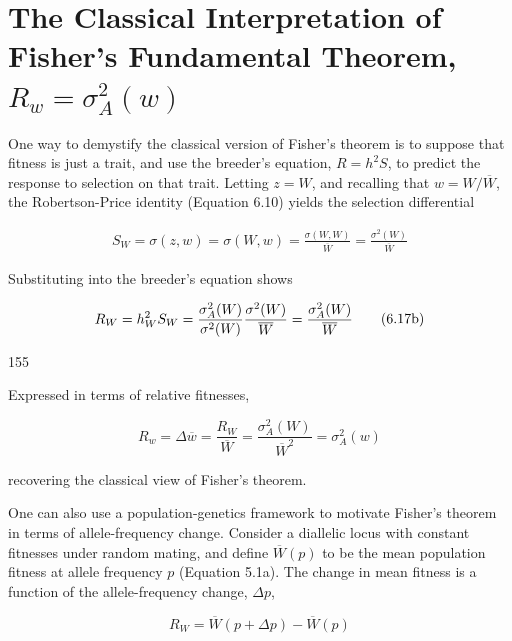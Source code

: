 \documentclass{article}
\begin{document}
\section{The Classical Interpretation of Fisher's Fundamental Theorem,  $ R_w = \sigma_A^2(w) $}
One way to demystify the classical version of Fisher's theorem is to suppose that fitness is just a trait, and use the breeder's equation,  $ R = h^2 S $, to predict the response to selection on that trait. Letting  $ z = W $, and recalling that  $ w = W/\overline{W} $, the Robertson-Price identity (Equation 6.10) yields the selection differential

\begin{equation}
\begin{align*}S_W=\sigma(z,w)=\sigma(W,w)=\frac{\sigma(W,W)}{\overline{W}}=\frac{\sigma^2(W)}{\overline{W}}\end{align*}
\tag{6.17a}
\label{eq:6_17a}
\end{equation}

Substituting into the breeder's equation shows

\begin{equation}
\begin{align*}R_W=h_W^2S_W={\sigma_A^2(W)\over\sigma^2(W)} {\sigma^2(W)\over\overline{W}}={\sigma_A^2(W)\over\overline{W}}\end{align*}
\tag{6.17b}
\label{eq:6_17b}
\end{equation}

155

Expressed in terms of relative fitnesses,

\begin{equation}
R_{w}=\Delta\overline{w}=\frac{R_{W}}{\overline{W}}=\frac{\sigma_{A}^{2}(W)}{\overline{W}^{2}}=\sigma_{A}^{2}(w)
\tag{6.17c}
\label{eq:6_17c}
\end{equation}

recovering the classical view of Fisher’s theorem.

One can also use a population-genetics framework to motivate Fisher’s theorem in terms of allele-frequency change. Consider a diallelic locus with constant fitnesses under random mating, and define  $ \overline{W}(p) $ to be the mean population fitness at allele frequency  $ p $ (Equation 5.1a). The change in mean fitness is a function of the allele-frequency change,  $ \Delta p $,

\begin{equation}
R_{W}=\overline{W}(p+\Delta p)-\overline{W}(p)
\tag{6.18a}
\label{eq:6_18a}
\end{equation}
\end{document}
